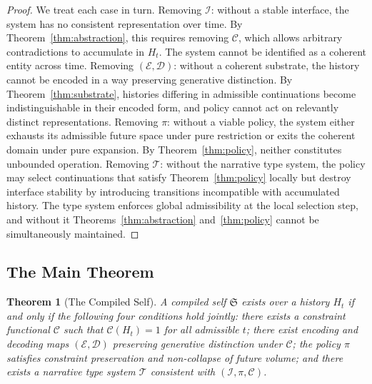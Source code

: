 \documentclass[12pt, a4paper]{article}
\theoremstyle{plain}
\newtheorem{theorem}{Theorem}[section]
\theoremstyle{definition}
\theoremstyle{remark}
\begin{document}
\begin{proof}
We treat each case in turn. Removing $\mathcal{I}$: without a stable interface, the system has no consistent representation over time. By Theorem~\ref{thm:abstraction}, this requires removing $\mathcal{C}$, which allows arbitrary contradictions to accumulate in $H_t$. The system cannot be identified as a coherent entity across time. Removing $(\mathcal{E}, \mathcal{D})$: without a coherent substrate, the history cannot be encoded in a way preserving generative distinction. By Theorem~\ref{thm:substrate}, histories differing in admissible continuations become indistinguishable in their encoded form, and policy cannot act on relevantly distinct representations. Removing $\pi$: without a viable policy, the system either exhausts its admissible future space under pure restriction or exits the coherent domain under pure expansion. By Theorem~\ref{thm:policy}, neither constitutes unbounded operation. Removing $\mathcal{T}$: without the narrative type system, the policy may select continuations that satisfy Theorem~\ref{thm:policy} locally but destroy interface stability by introducing transitions incompatible with accumulated history. The type system enforces global admissibility at the local selection step, and without it Theorems~\ref{thm:abstraction} and~\ref{thm:policy} cannot be simultaneously maintained.
\end{proof}

\subsection{The Main Theorem}

\begin{theorem}[The Compiled Self]
\label{thm:self}
A compiled self $\mathfrak{S}$ exists over a history $H_t$ if and only if the following four conditions hold jointly: there exists a constraint functional $\mathcal{C}$ such that $\mathcal{C}(H_t) = 1$ for all admissible $t$; there exist encoding and decoding maps $(\mathcal{E}, \mathcal{D})$ preserving generative distinction under $\mathcal{C}$; the policy $\pi$ satisfies constraint preservation and non-collapse of future volume; and there exists a narrative type system $\mathcal{T}$ consistent with $(\mathcal{I}, \pi, \mathcal{C})$.
\end{theorem}
\end{document}
